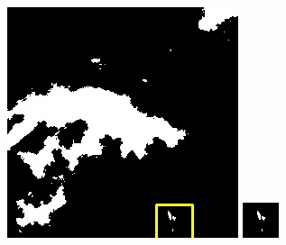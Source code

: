 \documentclass[UTF8]{ctexart}
\begin{document}
\begin{figure}[H]
{\begin{minipage}[b]{0.15\linewidth}
            \vspace{4pt}
            \includegraphics[width=1\linewidth]{../log/cut/LC81570452014213LGN00_06157_mask.jpg}\vspace{4pt}
            \includegraphics[width=1\linewidth]{../log/cut/tmp_cut_LC81570452014213LGN00_06157_mask.jpg}

\end{minipage}}
\end{figure}
\end{document}

